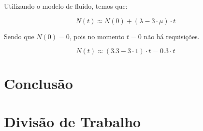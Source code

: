 \documentclass[conference]{IEEEtran}
\begin{document}
Utilizando o modelo de fluido, temos que:

$$
N(t) \approx N(0) + (\lambda - 3 \cdot \mu) \cdot t
$$

Sendo que $N(0) = 0$, pois no momento $t = 0$ não há requisições.

$$
N(t) \approx (3.3 - 3 \cdot 1) \cdot t = 0.3 \cdot t
$$

\section{Conclusão}


\section*{Divisão de Trabalho}
\end{document}
